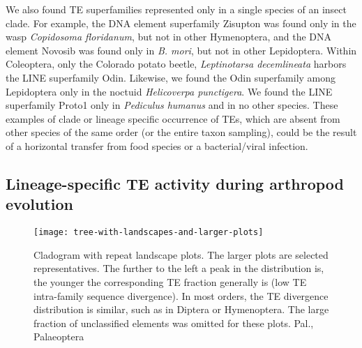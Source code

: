 We also found TE superfamilies represented only in a single species of
an insect clade. For example, the DNA element superfamily Zisupton was
found only in the wasp \emph{Copidosoma floridanum}, but not in other
Hymenoptera, and the DNA element Novosib was found only in \emph{B.
mori}, but not in other Lepidoptera. Within Coleoptera, only the
Colorado potato beetle, \emph{Leptinotarsa decemlineata} harbors the
LINE superfamily Odin. Likewise, we found the Odin superfamily among
Lepidoptera only in the noctuid \emph{Helicoverpa punctigera}. We found
the LINE superfamily Proto1 only in \emph{Pediculus humanus} and in no
other species. These examples of clade or lineage specific occurrence of
TEs, which are absent from other species of the same order (or the
entire taxon sampling), could be the result of a horizontal transfer
from food species or a bacterial/viral infection.



\subsection{Lineage-specific TE activity during arthropod
evolution}\label{lineage-specific-te-activity-during-arthropod-evolution}

\begin{figure}[h!]
\begin{center}
\texttt{[image: tree-with-landscapes-and-larger-plots]}
\caption[Arthropod repeat landscapes]{{Cladogram with repeat landscape plots. The larger plots are selected
representatives. The further to the left a peak in the distribution is,
the younger the corresponding TE fraction generally is (low TE
intra-family sequence divergence). In most orders, the TE divergence
distribution is similar, such as in Diptera or Hymenoptera. The large
fraction of unclassified elements was omitted for these plots. Pal.,
Palaeoptera%
}}%
\label{fig:landscapes}%
\end{center}
\end{figure}

